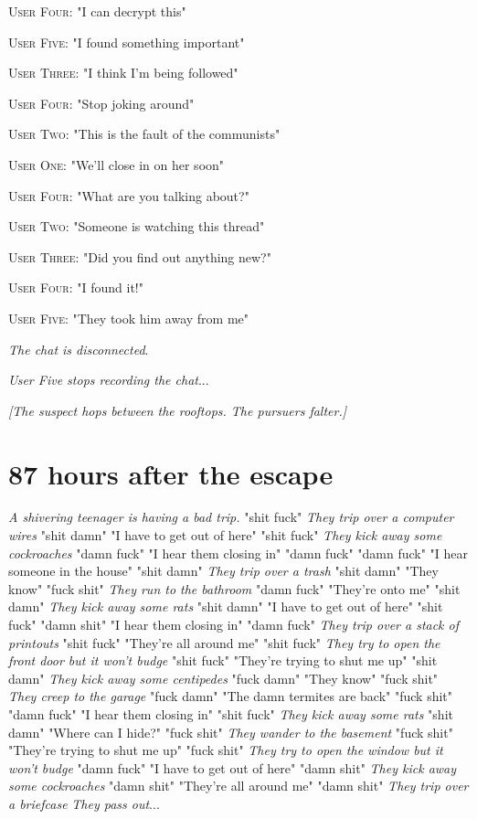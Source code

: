 \documentclass{report}
\begin{document}
\textsc{User Four}: "I can decrypt this" 

\textsc{User Five}: "I found something important" 

\textsc{User Three}: "I think I'm being followed" 

\textsc{User Four}: "Stop joking around" 

\textsc{User Two}: "This is the fault of the communists" 

\textsc{User One}: "We'll close in on her soon" 

\textsc{User Four}: "What are you talking about?" 

\textsc{User Two}: "Someone is watching this thread" 

\textsc{User Three}: "Did you find out anything new?" 

\textsc{User Four}: "I found it!" 

\textsc{User Five}: "They took him away from me" 

\textit{The chat is disconnected}. 

\textit{User Five stops recording the chat}...

\textit{[The suspect hops between the rooftops. The pursuers falter.]}


\section*{87 \small{hours after the escape}}

\textit{A shivering teenager is having a bad trip.} "shit fuck" \textit{They trip over a computer wires} "shit damn" "I have to get out of here" "shit fuck" \textit{They kick away some cockroaches} "damn fuck" "I hear them closing in" "damn fuck" \textit{} "damn fuck" "I hear someone in the house" "shit damn" \textit{They trip over a trash} "shit damn" "They know" "fuck shit" \textit{They run to the bathroom} "damn fuck" "They're onto me" "shit damn" \textit{They kick away some rats} "shit damn" "I have to get out of here" "shit fuck" \textit{} "damn shit" "I hear them closing in" "damn fuck" \textit{They trip over a stack of printouts} "shit fuck" "They're all around me" "shit fuck" \textit{They try to open the front door but it won't budge} "shit fuck" "They're trying to shut me up" "shit damn" \textit{They kick away some centipedes} "fuck damn" "They know" "fuck shit" \textit{They creep to the garage} "fuck damn" "The damn termites are back" "fuck shit" \textit{} "damn fuck" "I hear them closing in" "shit fuck" \textit{They kick away some rats} "shit damn" "Where can I hide?" "fuck shit" \textit{They wander to the basement} "fuck shit" "They're trying to shut me up" "fuck shit" \textit{They try to open the window but it won't budge} "damn fuck" "I have to get out of here" "damn shit" \textit{They kick away some cockroaches} "damn shit" "They're all around me" "damn shit" \textit{They trip over a briefcase} \textit{They pass out}...
\end{document}
